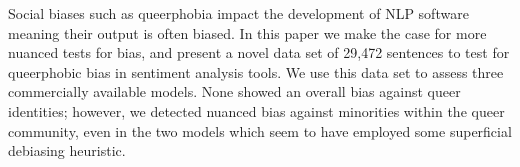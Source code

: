 Social biases such as queerphobia impact the development of NLP software meaning their output is often biased. In this paper we make the case for more nuanced tests for bias, and present a novel data set of 29,472 sentences to test for queerphobic bias in sentiment analysis tools. We use this data set to assess three commercially available models. None showed an overall bias against queer identities; however, we detected nuanced bias against minorities within the queer community, even in the two models which seem to have employed some superficial debiasing heuristic.
